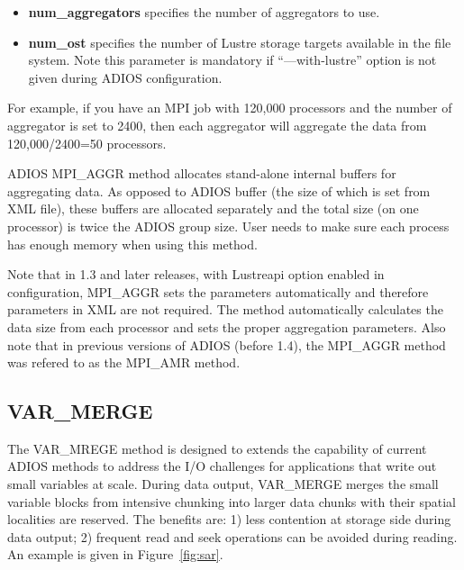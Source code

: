 \begin{itemize}
\item \textbf{num\_aggregators} specifies the number of aggregators 
to use.
\item \textbf{num\_ost }specifies the number of Lustre storage targets 
 available in the file system. Note this parameter is mandatory if ``---with-lustre'' 
option is not given during ADIOS configuration.
\end{itemize}

For example, if you have an MPI job with 120,000 processors and the number of aggregator 
is set to 2400, then each aggregator will aggregate the data from 120,000/2400=50 
processors.

ADIOS MPI\_AGGR method allocates stand-alone internal buffers for aggregating data. 
As opposed to ADIOS buffer (the size of which is set from XML file), these buffers 
are allocated separately and the total size (on one processor) is twice the ADIOS 
group size. User needs to make sure each process has enough memory when using this 
method.  

Note that in 1.3 and later releases, with Lustreapi option enabled in configuration, 
MPI\_AGGR sets the parameters automatically and therefore parameters in XML are 
not required. The method automatically calculates the data size from each processor 
and sets the proper aggregation parameters. Also note that in previous versions
of ADIOS (before 1.4), the MPI\_AGGR method was refered to as the MPI\_AMR
method. 


\subsection{VAR\_MERGE}
\label{section-method-varmerge}
The VAR\_MREGE method is designed to extends the capability of current ADIOS
methods to address the I/O challenges for applications
that write out small variables at scale. During data output, 
VAR\_MERGE merges the small variable blocks from intensive chunking into
larger data chunks with their spatial localities are reserved. The benefits
are: 1) less contention at storage side during data
output; 2) frequent read and seek operations can be avoided during reading.
An example is given in Figure~\ref{fig:sar}. 


